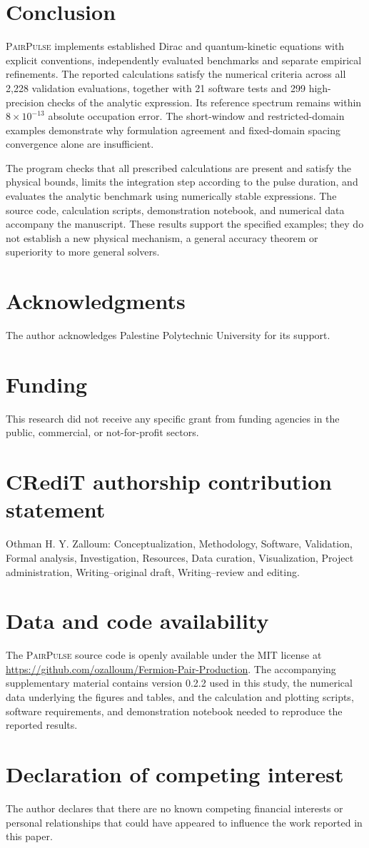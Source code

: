\documentclass[11pt,a4paper]{article}
\newcommand{\PairPulse}{\textsc{PairPulse}}
\newcommand{\ack}[1]{\section*{Acknowledgments}#1}
\newcommand{\funding}[1]{\section*{Funding}#1}
\newcommand{\roles}[1]{\section*{CRediT authorship contribution statement}#1}
\newcommand{\data}[1]{\section*{Data and code availability}#1}
\begin{document}
\section{Conclusion}
\PairPulse{} implements established Dirac and quantum-kinetic equations with explicit conventions, independently evaluated benchmarks and separate empirical refinements. The reported calculations satisfy the numerical criteria across all 2,228 validation evaluations, together with 21 software tests and 299 high-precision checks of the analytic expression. Its reference spectrum remains within $8\times10^{-13}$ absolute occupation error. The short-window and restricted-domain examples demonstrate why formulation agreement and fixed-domain spacing convergence alone are insufficient.

The program checks that all prescribed calculations are present and satisfy the physical bounds, limits the integration step according to the pulse duration, and evaluates the analytic benchmark using numerically stable expressions. The source code, calculation scripts, demonstration notebook, and numerical data accompany the manuscript. These results support the specified examples; they do not establish a new physical mechanism, a general accuracy theorem or superiority to more general solvers.

\ack{The author acknowledges Palestine Polytechnic University for its support.}

\funding{This research did not receive any specific grant from funding agencies in the public, commercial, or not-for-profit sectors.}

\roles{Othman H. Y. Zalloum: Conceptualization, Methodology, Software, Validation, Formal analysis, Investigation, Resources, Data curation, Visualization, Project administration, Writing--original draft, Writing--review and editing.}

\data{The \PairPulse{} source code is openly available under the MIT license at \url{https://github.com/ozalloum/Fermion-Pair-Production}. The accompanying supplementary material contains version 0.2.2 used in this study, the numerical data underlying the figures and tables, and the calculation and plotting scripts, software requirements, and demonstration notebook needed to reproduce the reported results.}

\section*{Declaration of competing interest}
The author declares that there are no known competing financial interests or personal relationships that could have appeared to influence the work reported in this paper.
\end{document}
